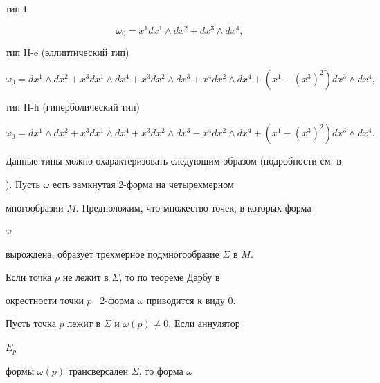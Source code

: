 тип I


$$


\omega_0 = x^1 dx^1\wedge dx^2 + dx^3\wedge dx^4,


$$





тип II-e (эллиптический тип)


\begin{equation}


\omega_0 = dx^1 \wedge dx^2 + x^3 dx^1 \wedge dx^4 + x^3 dx^2 \wedge dx^3


+ x^4 dx^2 \wedge dx^4 + (x^1- (x^3)^2) dx^3 \wedge dx^4,


\label{eq3}


\end{equation}





тип II-h (гиперболический тип)


\begin{equation}


\omega_0 = dx^1 \wedge dx^2 + x^3 dx^1 \wedge dx^4 + x^3 dx^2 \wedge dx^3


- x^4 dx^2 \wedge dx^4 + (x^1- (x^3)^2) dx^3 \wedge dx^4.


\label{eq4}


\end{equation}





Данные типы можно охарактеризовать следующим образом (подробности см. в


\cite{Mart1}). Пусть $\omega$ есть замкнутая 2-форма на четырехмерном


многообразии $M$. Предположим, что множество точек, в которых форма


$\omega$


вырождена, образует трехмерное подмногообразие $\Sigma$ в $M$.





Если точка $p$ не лежит в $\Sigma$, то по теореме Дарбу в


окрестности точки $p$ \ 2-форма $\omega$ приводится к виду 0.





Пусть точка $p$ лежит в $\Sigma$ и $\omega(p) \ne 0$. Если аннулятор


$E_p$


формы $\omega(p)$ трансверсален $\Sigma$, то форма $\omega$


